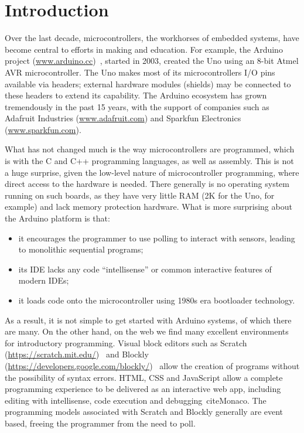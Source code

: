 \section{Introduction}
\label{sec:intro}

Over the last decade, microcontrollers, the workhorses of embedded systems, have become 
central to efforts in making and education. For example, the Arduino project 
(\url{www.arduino.cc})~\cite{buildingArduino2014}, 
started in 2003, created the Uno using an 8-bit Atmel 
AVR microcontroller. The Uno makes most of its microcontrollers I/O pins available via headers;
external hardware modules (shields) may be connected to these headers to extend 
its capability.    The Arduino ecosystem has grown tremendously in the past 15 years, 
with the support of companies such as Adafruit Industries (\url{www.adafruit.com}) and 
Sparkfun Electronics (\url{www.sparkfun.com}).

What has not changed much is the way microcontrollers are programmed,
which is with the C and C++ programming languages, as well as assembly.   
This is not a huge surprise, given the low-level nature of microcontroller programming, 
where direct access to the hardware is needed. There generally is no operating 
system running on such boards, as they have very little RAM (2K for the Uno, for example) and 
lack memory protection hardware. What is more surprising about the Arduino platform is that:
\begin{itemize}
\item it encourages the programmer to use polling to interact with sensors, 
leading to monolithic sequential programs;
\item its IDE lacks any code ``intellisense'' or common interactive features of modern IDEs;
\item it loads code onto the microcontroller using 1980s era bootloader technology.
\end{itemize}
As a result, it is not simple to get started with Arduino systems, of which there are many. 
On the other hand, on the web we find many excellent environments for introductory programming. 
Visual block editors such as Scratch (\url{https://scratch.mit.edu/})~\cite{ScratchCACM2009,BlocksBeyondCACM2017} 
and Blockly (\url{https://developers.google.com/blockly/})~\cite{Blocky2015}
allow the creation of programs without the possibility of syntax errors. 
HTML, CSS and JavaScript allow a complete programming experience to be delivered as an interactive 
web app, including editing with intellisense, code execution and debugging~cite{Monaco}.
The programming models associated with Scratch and Blockly generally are 
event based, freeing the programmer from the need to poll.


